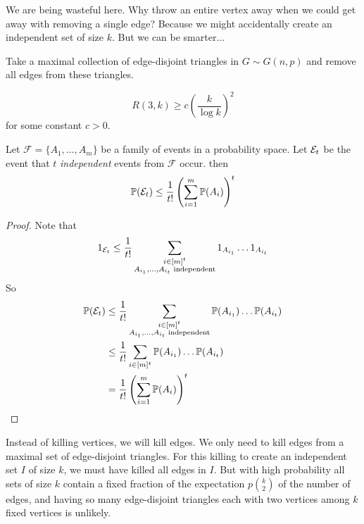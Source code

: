 \documentclass{article}
\begin{document}
We are being wasteful here. Why throw an entire vertex away when we could get away with removing a single edge? Because we might accidentally create an independent set of size $k$. But we can be smarter...

\begin{idea}
  Take a maximal collection of edge-disjoint triangles in $G \sim G(n, p)$ and remove all edges from these triangles.
\end{idea}

\begin{thm}[Erd\H os]
  $$R(3, k) \ge c\left(\frac k{\log k}\right)^2$$
  for some constant $c > 0$.
\end{thm}

\begin{lemma}
  Let $\mathcal F = \{A_1, \dots, A_m\}$ be a family of events in a probability space. Let $\mathcal E_t$ be the event that $t$ {\it independent} events from $\mathcal F$ occur. then
  $$\mathbb P(\mathcal E_t) \le \frac 1{t!}\left(\sum_{i = 1}^m \mathbb P(A_i)\right)^t$$
\end{lemma}
\begin{proof}
  Note that
  $$1_{\mathcal E_t} \le \frac 1{t!} \sum_{\substack{i \in [m]^t \\ A_{i_1}, \dots, A_{i_t}\text{ independent}}} 1_{A_{i_1}} \dots 1_{A_{i_t}}$$
  So
  \begin{align*}
    \mathbb P(\mathcal E_t)
    & \le \frac 1{t!} \sum_{\substack{i \in [m]^t \\ A_{i_1}, \dots, A_{i_t}\text{ independent}}} \mathbb P(A_{i_1}) \dots \mathbb P(A_{i_t}) \\
    & \le \frac 1{t!} \sum_{i \in [m]^t} \mathbb P(A_{i_1}) \dots \mathbb P(A_{i_t}) \\
    & = \frac 1{t!} \left(\sum_{i = 1}^m \mathbb P(A_i)\right)^t
  \end{align*}
\end{proof}

\newlec

\begin{idea}
  Instead of killing vertices, we will kill edges. We only need to kill edges from a maximal set of edge-disjoint triangles. For this killing to create an independent set $I$ of size $k$, we must have killed all edges in $I$. But with high probability all sets of size $k$ contain a fixed fraction of the expectation $p\binom k2$ of the number of edges, and having so many edge-disjoint triangles each with two vertices among $k$ fixed vertices is unlikely.
\end{idea}
\end{document}
